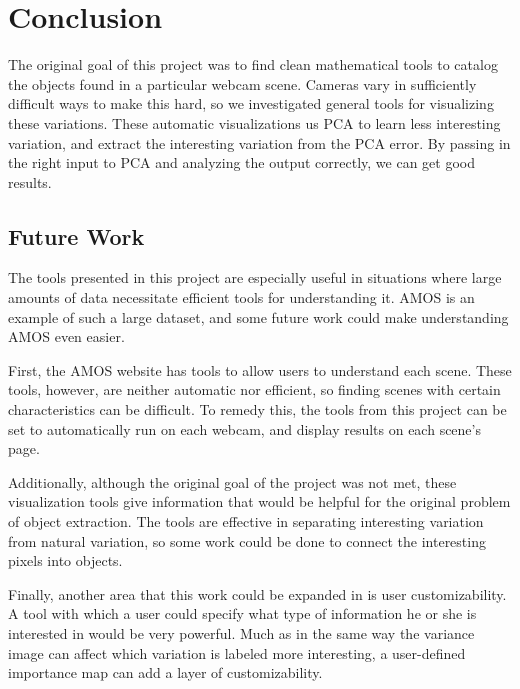 \chapter{Conclusion}
\label{cpt:conclusion}

The original goal of this project was to find clean mathematical tools to catalog the objects found in a particular webcam scene.  Cameras vary in sufficiently difficult ways to make this hard, so we investigated general tools for visualizing these variations.  These automatic visualizations us PCA to learn less interesting variation, and extract the interesting variation from the PCA error.  By passing in the right input to PCA and analyzing the output correctly, we can get good results.

\section{Future Work}

The tools presented in this project are especially useful in situations where large amounts of data necessitate efficient tools for understanding it.  AMOS is an example of such a large dataset, and some future work could make understanding AMOS even easier.

First, the AMOS website has tools to allow users to understand each scene.  These tools, however, are neither automatic nor efficient, so finding scenes with certain characteristics can be difficult.  To remedy this, the tools from this project can be set to automatically run on each webcam, and display results on each scene's page.

Additionally, although the original goal of the project was not met, these visualization tools give information that would be helpful for the original problem of object extraction.  The tools are effective in separating interesting variation from natural variation, so some work could be done to connect the interesting pixels into objects.

Finally, another area that this work could be expanded in is user customizability.  A tool with which a user could specify what type of information he or she is interested in would be very powerful.  Much as in the same way the variance image can affect which variation is labeled more interesting, a user-defined importance map can add a layer of customizability.




